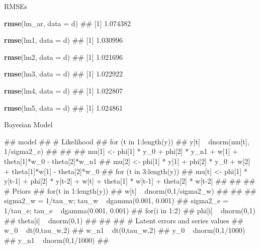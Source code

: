 \documentclass[11pt,ignorenonframetext,]{beamer}
\newenvironment{Shaded}{}{}
\newcommand{\KeywordTok}[1]{\textcolor[rgb]{0.00,0.44,0.13}{\textbf{#1}}}
\newcommand{\DataTypeTok}[1]{\textcolor[rgb]{0.56,0.13,0.00}{#1}}
\newcommand{\NormalTok}[1]{#1}
\let\oldShaded\Shaded
\let\endoldShaded\endShaded
\renewenvironment{Shaded}{\footnotesize\begin{spacing}{0.9}\oldShaded}{\endoldShaded\end{spacing}}
\let\oldverbatim\verbatim
\let\endoldverbatim\endverbatim
\renewenvironment{verbatim}{\footnotesize\begin{spacing}{0.9}\oldverbatim}{\endoldverbatim\end{spacing}}
\newcommand{\tinyoutput}{
  \renewenvironment{Shaded}{\tiny\begin{spacing}{0.9}\oldShaded}{\endoldShaded\end{spacing}}
  \renewenvironment{verbatim}{\tiny\begin{spacing}{0.9}\oldverbatim}{\endoldverbatim\end{spacing}}
}
\begin{document}
\begin{frame}[fragile]{RMSEs}

\begin{Shaded}
\begin{Highlighting}[]
\KeywordTok{rmse}\NormalTok{(lm_ar, }\DataTypeTok{data =}\NormalTok{ d)}
\NormalTok{## [1] 1.074382}

\KeywordTok{rmse}\NormalTok{(lm1, }\DataTypeTok{data =}\NormalTok{ d)}
\NormalTok{## [1] 1.030996}

\KeywordTok{rmse}\NormalTok{(lm2, }\DataTypeTok{data =}\NormalTok{ d)}
\NormalTok{## [1] 1.021696}

\KeywordTok{rmse}\NormalTok{(lm3, }\DataTypeTok{data =}\NormalTok{ d)}
\NormalTok{## [1] 1.022922}

\KeywordTok{rmse}\NormalTok{(lm4, }\DataTypeTok{data =}\NormalTok{ d)}
\NormalTok{## [1] 1.022807}

\KeywordTok{rmse}\NormalTok{(lm5, }\DataTypeTok{data =}\NormalTok{ d)}
\NormalTok{## [1] 1.024861}
\end{Highlighting}
\end{Shaded}

\end{frame}

\begin{frame}[fragile]{Bayesian Model}

\tinyoutput

\begin{verbatim}
## model{
## # Likelihood
##   for (t in 1:length(y)) {
##     y[t] ~ dnorm(mu[t], 1/sigma2_e)
##   }                                   
## 
##   mu[1] <- phi[1] * y_0  + phi[2] * y_n1 + w[1] + theta[1]*w_0  - theta[2]*w_n1
##   mu[2] <- phi[1] * y[1] + phi[2] * y_0  + w[2] + theta[1]*w[1] - theta[2]*w_0   
##   for (t in 3:length(y)) { 
##     mu[t] <- phi[1] * y[t-1] + phi[2] * y[t-2] + w[t] + theta[1] * w[t-1] + theta[2] * w[t-2]
##   }
##   
## # Priors
##   for(t in 1:length(y)){
##     w[t] ~ dnorm(0,1/sigma2_w)
##   }
## 
##   sigma2_w = 1/tau_w; tau_w ~ dgamma(0.001, 0.001) 
##   sigma2_e = 1/tau_e; tau_e ~ dgamma(0.001, 0.001) 
##   for(i in 1:2) {
##     phi[i] ~ dnorm(0,1)
##     theta[i] ~ dnorm(0,1)
##   }
## 
## # Latent errors and series values
##   w_0  ~ dt(0,tau_w,2)
##   w_n1 ~ dt(0,tau_w,2)
##   y_0  ~ dnorm(0,1/1000)
##   y_n1 ~ dnorm(0,1/1000)
## }
\end{verbatim}

\end{frame}
\end{document}
